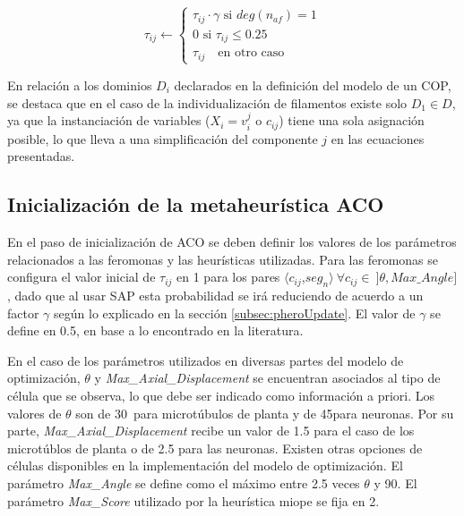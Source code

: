\begin{equation}
    \tau_{ij} \leftarrow
        \begin{cases}
         \tau_{ij} \cdot \gamma \text{ si } deg(n_{af}) = 1  \\[3ex]
        
        \text{0 si } \tau_{ij} \leq 0.25 \\[3ex]
        \tau_{ij} \quad \text{en otro caso}
        \end{cases}
    \label{eq:antiPheroSAP_neuron}
\end{equation}


En relaci\'on a los dominios $D_i$ declarados en la definici\'on del modelo de un COP, se destaca que en el caso de la individualizaci\'on de filamentos existe solo $D_1 \in D$, ya que la instanciaci\'on de variables ($X_i = v_{i}^{j}$ o $c_{ij}$) tiene una sola asignaci\'on posible, lo que lleva a una simplificaci\'on del componente $j$ en las ecuaciones presentadas.

\subsection{Inicializaci\'on de la metaheur\'istica ACO}

En el paso de inicializaci\'on de ACO se deben definir los valores de los par\'ametros relacionados a las feromonas y las heur\'isticas utilizadas. Para las feromonas se configura el valor inicial de $\tau_{ij}$ en 1 para los pares $\langle c_{ij}$,$ seg_{n}\rangle \> \forall c_{ij} \in \> ]\theta, Max\_Angle]$, dado que al usar SAP esta probabilidad se ir\'a reduciendo de acuerdo a un factor $\gamma$ seg\'un lo explicado en la secci\'on \ref{subsec:pheroUpdate}. El valor de $\gamma$ se define en 0.5, en base a lo encontrado en la literatura.

En el caso de los par\'ametros utilizados en diversas partes del modelo de optimizaci\'on, $\theta$ y {\it Max\_Axial\_Displacement} se encuentran asociados al tipo de c\'elula que se observa, lo que debe ser indicado como informaci\'on a priori. Los valores de $\theta$ son de 30\textdegree ~para microt\'ubulos de planta y de 45\textdegree para neuronas. Por su parte, {\it Max\_Axial\_Displacement} recibe un valor de 1.5 para el caso de los microt\'ublos de planta o de 2.5 para las neuronas. Existen otras opciones de c\'elulas disponibles en la implementaci\'on del modelo de optimizaci\'on. El par\'ametro {\it Max\_Angle} se define como el m\'aximo entre 2.5 veces $\theta$ y 90. El par\'ametro {\it Max\_Score} utilizado por la heur\'istica miope se fija en 2.


